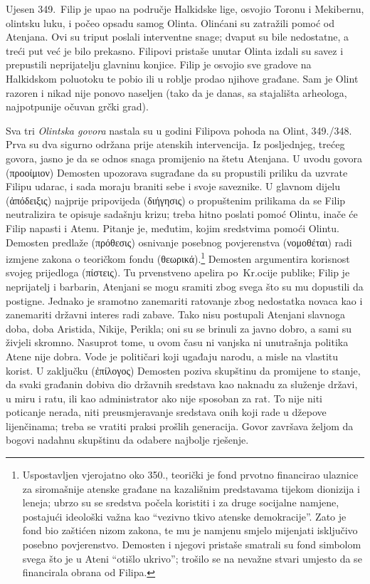Ujesen 349.\ Filip je upao na područje Halkidske lige, osvojio Toronu i Mekibernu, olintsku luku, i počeo opsadu samog Olinta. Olinćani su zatražili pomoć od Atenjana. Ovi su triput poslali interventne snage; dvaput su bile nedostatne, a treći put već je bilo prekasno. Filipovi pristaše unutar Olinta izdali su savez i prepustili neprijatelju glavninu konjice. Filip je osvojio sve gradove na Halkidskom poluotoku te pobio ili u roblje prodao njihove građane. Sam je Olint razoren i nikad nije ponovo naseljen (tako da je danas, sa stajališta arheologa, najpotpunije očuvan grčki grad).

Sva tri \textit{Olintska govora} nastala su u godini Filipova pohoda na Olint, 349./348. Prva su dva sigurno održana prije atenskih intervencija. Iz posljednjeg, trećeg govora, jasno je da se odnos snaga promijenio na štetu Atenjana. U uvodu govora \textgreek[variant=ancient]{(προοίμιον)} Demosten upozorava sugrađane da su propustili priliku da uzvrate Filipu udarac, i sada moraju braniti sebe i svoje saveznike. U glavnom dijelu \textgreek[variant=ancient]{(ἀπόδειξις)} najprije pripovijeda  \textgreek[variant=ancient]{(διήγησις)} o propuštenim prilikama da se Filip neutralizira te opisuje sadašnju krizu; treba hitno poslati pomoć Olintu, inače će Filip napasti i Atenu. Pitanje je, međutim, kojim sredstvima pomoći Olintu. Demosten predlaže \textgreek[variant=ancient]{(πρόθεσις)} osnivanje posebnog povjerenstva \textgreek[variant=ancient]{(νομοθέται)} radi izmjene zakona o teoričkom fondu \textgreek[variant=ancient]{(θεωρικά).}\footnote{Uspostavljen vjerojatno oko 350., teorički je fond prvotno financirao ulaznice za siromašnije atenske građane na kazališnim predstavama tijekom dionizija i leneja; ubrzo su se sredstva počela koristiti i za druge socijalne namjene, postajući ideološki važna kao ``vezivno tkivo atenske demokracije''. Zato je fond bio zaštićen nizom zakona, te mu je namjenu smjelo mijenjati isključivo posebno povjerenstvo. Demosten i njegovi pristaše smatrali su fond simbolom svega što je u Ateni ``otišlo ukrivo''; trošilo se na nevažne stvari umjesto da se financirala obrana od Filipa.} Demosten argumentira korisnost svojeg prijedloga (πίστεις). Tu prvenstveno apelira po~Kr.ocije publike; Filip je neprijatelj i barbarin, Atenjani se mogu sramiti zbog svega što su mu dopustili da postigne. Jednako je sramotno zanemariti ratovanje zbog nedostatka novaca kao i zanemariti državni interes radi zabave. Tako nisu postupali Atenjani slavnoga doba, doba Aristida, Nikije, Perikla; oni su se brinuli za javno dobro, a sami su živjeli skromno. Nasuprot tome, u ovom času ni vanjska ni unutrašnja politika Atene nije dobra. Vode je političari koji ugađaju narodu, a misle na vlastitu korist. U zaključku (ἐπίλογος) Demosten poziva skupštinu da promijene to stanje, da svaki građanin dobiva dio državnih sredstava kao naknadu za služenje državi, u miru i ratu, ili kao administrator ako nije sposoban za rat. To nije niti poticanje nerada, niti preusmjeravanje sredstava onih koji rade u džepove lijenčinama; treba se vratiti praksi prošlih generacija. Govor završava željom da bogovi nadahnu skupštinu da odabere najbolje rješenje.

